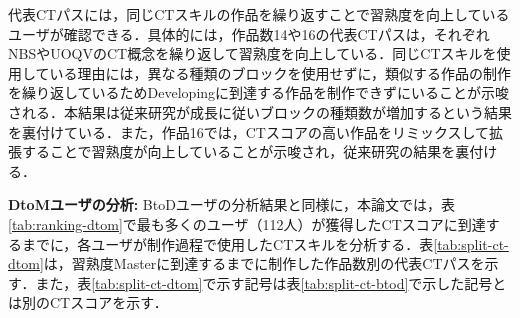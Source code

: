 \documentclass[submit,ses,noauthor]{ipsj}
\begin{document}
代表CTパスには，同じCTスキルの作品を繰り返すことで習熟度を向上しているユーザが確認できる．具体的には，作品数14や16の代表CTパスは，それぞれNBSやUOQVのCT概念を繰り返して習熟度を向上している．同じCTスキルを使用している理由には，異なる種類のブロックを使用せずに，類似する作品の制作を繰り返しているためDevelopingに到達する作品を制作できずにいることが示唆される．本結果は従来研究\cite{Yang_2015}が成長に従いブロックの種類数が増加するという結果を裏付けている．また，作品16では，CTスコアの高い作品をリミックスして拡張することで習熟度が向上していることが示唆され，従来研究\cite{Yang_2015}の結果を裏付ける．




\noindent\textbf{DtoMユーザの分析: }BtoDユーザの分析結果と同様に，本論文では，表\ref{tab:ranking-dtom}で最も多くのユーザ（112人）が獲得したCTスコアに到達するまでに，各ユーザが制作過程で使用したCTスキルを分析する．表\ref{tab:split-ct-dtom}は，習熟度Masterに到達するまでに制作した作品数別の代表CTパスを示す．また，表\ref{tab:split-ct-dtom}で示す記号は表\ref{tab:split-ct-btod}で示した記号とは別のCTスコアを示す．%
\end{document}
